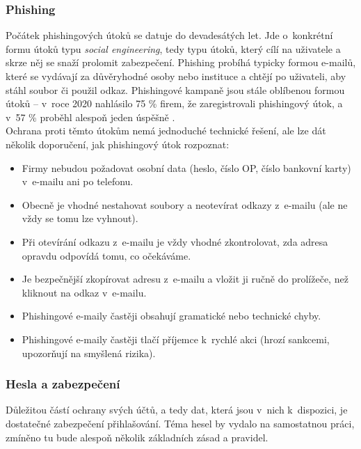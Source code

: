 \subsubsection*{Phishing}
Počátek phishingových útoků se datuje do devadesátých let. Jde o~konkrétní formu útoků typu \textit{social engineering}, tedy typu útoků, který cílí na uživatele a skrze něj se snaží prolomit zabezpečení. Phishing probíhá typicky formou e-mailů, které se vydávají za důvěryhodné osoby nebo instituce a chtějí po uživateli, aby stáhl soubor či použil odkaz. Phishingové kampaně jsou stále oblíbenou formou útoků -- v~roce 2020 nahlásilo 75 \% firem, že zaregistrovali phishingový útok, a v~57 \% proběhl alespoň jeden úspěšně \citep{phishing-success}.\\
Ochrana proti těmto útokům nemá jednoduché technické řešení, ale lze dát několik doporučení, jak phishingový útok rozpoznat:
\begin{itemize}
	\item Firmy nebudou požadovat osobní data (heslo, číslo OP, číslo bankovní karty) v~e-mailu ani po telefonu.
	\item Obecně je vhodné nestahovat soubory a neotevírat odkazy z~e-mailu (ale ne vždy se tomu lze vyhnout).
	\item Při otevírání odkazu z~e-mailu je vždy vhodné zkontrolovat, zda adresa opravdu odpovídá tomu, co očekáváme.
	\item Je bezpečnější zkopírovat adresu z~e-mailu a vložit ji ručně do prolížeče, než kliknout na odkaz v~e-mailu.
	\item Phishingové e-maily častěji obsahují gramatické nebo technické chyby.
	\item Phishingové e-maily častěji tlačí příjemce k~rychlé akci (hrozí sankcemi, upozorňují na smyšlená rizika).
\end{itemize}




\subsubsection*{Hesla a zabezpečení}
Důležitou částí ochrany svých účtů, a tedy dat, která jsou v~nich k~dispozici, je dostatečné zabezpečení přihlašování. Téma hesel by vydalo na samostatnou práci, zmíněno tu bude alespoň několik základních zásad a pravidel.

